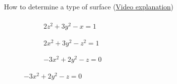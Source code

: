 \documentclass[aspectratio=169]{beamer}
\begin{document}
\begin{frame}[t]{How to determine a type of surface (\href{https://youtu.be/aM-0-oAppp0}{Video explanation})}
\framesubtitle{}
\vspace{-0.6cm}
\begin{figure}[H]
    \begin{subfigure}{0.32\textwidth}
        \caption*{$2z^2+3y^2-x=1$ \\ }
        \label{fig:1_1.png}
    \end{subfigure}
    \begin{subfigure}{0.32\textwidth}
        \caption*{$2x^2+3y^2-z^2=1$ \\ }
        \label{fig:1_2.png}
    \end{subfigure}
    \begin{subfigure}{0.32\textwidth}
        \caption*{$-3x^2+2y^2-z=0$ \\ }
        \label{fig:1_3.png}
    \end{subfigure}
\vspace{-0.3cm}


\end{figure}
\end{frame}
\end{document}

